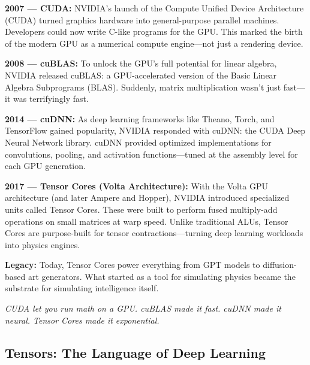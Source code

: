 \begin{tcolorbox}[colback=gray!5!white, colframe=black!80!white, title={Sidebar: How NVIDIA Engineered the Tensor Stack}]
    \textbf{2007 — CUDA:}  
    NVIDIA’s launch of the Compute Unified Device Architecture (CUDA) turned graphics hardware into general-purpose parallel machines. Developers could now write C-like programs for the GPU. This marked the birth of the modern GPU as a numerical compute engine—not just a rendering device.
    
    \medskip
    
    \textbf{2008 — cuBLAS:}  
    To unlock the GPU’s full potential for linear algebra, NVIDIA released cuBLAS: a GPU-accelerated version of the Basic Linear Algebra Subprograms (BLAS). Suddenly, matrix multiplication wasn’t just fast—it was terrifyingly fast.
    
    \medskip
    
    \textbf{2014 — cuDNN:}  
    As deep learning frameworks like Theano, Torch, and TensorFlow gained popularity, NVIDIA responded with cuDNN: the CUDA Deep Neural Network library. cuDNN provided optimized implementations for convolutions, pooling, and activation functions—tuned at the assembly level for each GPU generation.
    
    \medskip
    
    \textbf{2017 — Tensor Cores (Volta Architecture):}  
    With the Volta GPU architecture (and later Ampere and Hopper), NVIDIA introduced specialized units called Tensor Cores. These were built to perform fused multiply-add operations on small matrices at warp speed. Unlike traditional ALUs, Tensor Cores are purpose-built for tensor contractions—turning deep learning workloads into physics engines.
    
    \medskip
    
    \textbf{Legacy:}  
    Today, Tensor Cores power everything from GPT models to diffusion-based art generators. What started as a tool for simulating physics became the substrate for simulating intelligence itself.
    
    \begin{center}
    \emph{CUDA let you run math on a GPU. cuBLAS made it fast. cuDNN made it neural. Tensor Cores made it exponential.}
    \end{center}
\end{tcolorbox}



\subsection{Tensors: The Language of Deep Learning}


